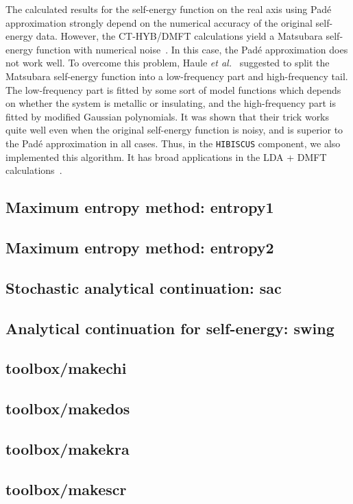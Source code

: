 The calculated results for the self-energy function on the real axis using Pad\'{e} approximation strongly depend on the numerical accuracy of the original self-energy data. However, the CT-HYB/DMFT calculations yield a Matsubara self-energy function with numerical noise~\cite{PhysRevB.76.205120}. In this case, the Pad\'{e} approximation does not work well. To overcome this problem, Haule \emph{et al.}~\cite{PhysRevB.81.195107} suggested to split the Matsubara self-energy function into a low-frequency part and high-frequency tail. The low-frequency part is fitted by some sort of model functions which depends on whether the system is metallic or insulating, and the high-frequency part is fitted by modified Gaussian polynomials. It was shown that their trick works quite well even when the original self-energy function is noisy, and is superior to the Pad\'{e} approximation in all cases. Thus, in the \texttt{HIBISCUS} component, we also implemented this algorithm. It has broad applications in the LDA + DMFT calculations~\cite{RevModPhys.78.865}.

\subsection{Maximum entropy method: entropy1}
\subsection{Maximum entropy method: entropy2}
\subsection{Stochastic analytical continuation: sac}
\subsection{Analytical continuation for self-energy: swing}
\subsection{toolbox/makechi}
\subsection{toolbox/makedos}
\subsection{toolbox/makekra}
\subsection{toolbox/makescr}

